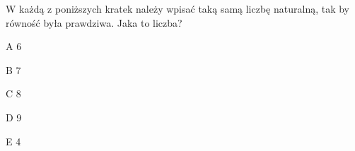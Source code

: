 \begin{tresc}
W każdą z poniższych kratek należy wpisać taką samą liczbę naturalną, tak by równość była prawdziwa. Jaka to liczba?
\end{tresc}
\begin{wariant}{A} 6 \end{wariant}
\begin{wariant}{B} 7 \end{wariant}
\begin{wariant}{C} 8 \end{wariant}
\begin{wariant}{D} 9 \end{wariant}
\begin{wariant}{E} 4 \end{wariant}
